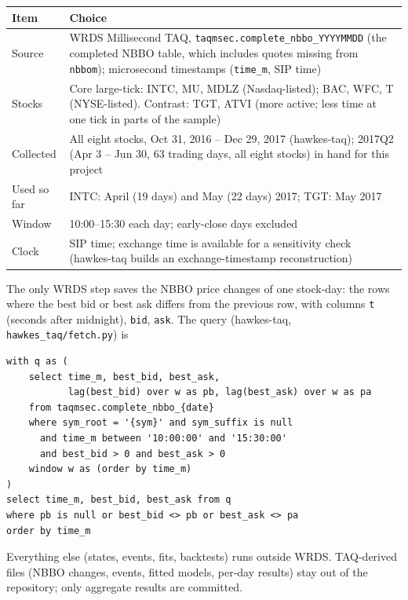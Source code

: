 \documentclass[11pt]{article}
\theoremstyle{definition}
\theoremstyle{remark}
\newcommand{\file}[1]{\texttt{#1}}
\begin{document}
\begin{center}
\begin{tabularx}{\textwidth}{@{}p{3.3cm}L@{}}
\toprule
Item & Choice \\
\midrule
Source & WRDS Millisecond TAQ, \file{taqmsec.complete\_nbbo\_YYYYMMDD} (the completed NBBO table, which includes quotes missing from \file{nbbom}); microsecond timestamps (\file{time\_m}, SIP time) \\
Stocks & Core large-tick: INTC, MU, MDLZ (Nasdaq-listed); BAC, WFC, T (NYSE-listed). Contrast: TGT, ATVI (more active; less time at one tick in parts of the sample) \\
Collected & All eight stocks, Oct 31, 2016 -- Dec 29, 2017 (hawkes-taq); 2017Q2 (Apr 3 -- Jun 30, 63 trading days, all eight stocks) in hand for this project \\
Used so far & INTC: April (19 days) and May (22 days) 2017; TGT: May 2017 \\
Window & 10:00--15:30 each day; early-close days excluded \\
Clock & SIP time; exchange time is available for a sensitivity check (hawkes-taq builds an exchange-timestamp reconstruction) \\
\bottomrule
\end{tabularx}
\end{center}

The only WRDS step saves the NBBO price changes of one stock-day: the rows where the best bid or best ask differs from the previous row, with columns \file{t} (seconds after midnight), \file{bid}, \file{ask}. The query (hawkes-taq, \file{hawkes\_taq/fetch.py}) is
\begin{verbatim}
with q as (
    select time_m, best_bid, best_ask,
           lag(best_bid) over w as pb, lag(best_ask) over w as pa
    from taqmsec.complete_nbbo_{date}
    where sym_root = '{sym}' and sym_suffix is null
      and time_m between '10:00:00' and '15:30:00'
      and best_bid > 0 and best_ask > 0
    window w as (order by time_m)
)
select time_m, best_bid, best_ask from q
where pb is null or best_bid <> pb or best_ask <> pa
order by time_m
\end{verbatim}
Everything else (states, events, fits, backtests) runs outside WRDS. TAQ-derived files (NBBO changes, events, fitted models, per-day results) stay out of the repository; only aggregate results are committed.
\end{document}
